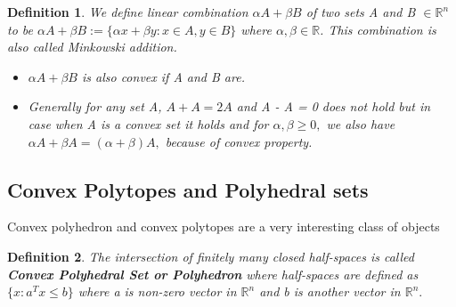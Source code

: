 \documentclass[oneside]{book}
\newtheorem{mydef}{Definition}
\begin{document}
\begin{mydef}
We define linear combination $\alpha A+\beta B$ of two sets A and B $\in \mathbb{R}^n$ to be 
$\alpha A+\beta B:=\{\alpha x+\beta y: x \in A, y \in B\}$ where $\alpha,\beta \in \mathbb{R}$.
This combination is also called Minkowski addition.


\begin{itemize}
    \item $\alpha A+\beta B $ is also convex if A and B are. 
\item
Generally for any set A, $A +A = 2A $ and A - A = 0  does not hold but in case when A is a convex set it holds and 
 for $\alpha, \beta \geq 0,$ we also have $\alpha A+\beta A=(\alpha+\beta) A,$ because of convex property. \end{itemize}
 \end{mydef}
 
 
 
 

 
 
 
 
 
 
 
 
 
 
 
 
 
 
 
 
 
 
 
 
 
 
 
 
 
 
 
\subsection{ Convex Polytopes and Polyhedral sets }
Convex polyhedron and convex polytopes are a very interesting class of objects 
\begin{mydef}

The intersection of finitely many closed half-spaces is called \\
\textbf{ Convex Polyhedral Set  or Polyhedron}
 where half-spaces are defined as $\{ x : a^{T}x \leq b\} $  where a is non-zero vector in $\mathbb{R}^n$ and b is another vector in  $\mathbb{R}^n.$  
 
 
\end{mydef}
\end{document}
